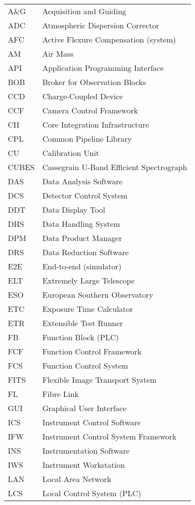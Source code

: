 \begin{longtable}{ |l|l| }
A\&G & Acquisition and Guiding \\
ADC & Atmospheric Dispersion Corrector \\
AFC & Active Flexure Compensation (system) \\
AM & Air Mass \\
API & Application Programming Interface \\
BOB & Broker for Observation Blocks \\
CCD & Charge-Coupled Device \\
CCF & Camera Control Framework \\
CII & Core Integration Infrastructure \\
CPL & Common Pipeline Library \\
CU & Calibration Unit \\
CUBES & Cassegrain U-Band Efficient Spectrograph \\
DAS & Data Analysis Software \\
DCS & Detector Control System \\
DDT & Data Display Tool \\
DHS & Data Handling System \\
DPM & Data Product Manager \\
DRS & Data Reduction Software \\
E2E & End-to-end (simulator) \\
ELT & Extremely Large Telescope \\
ESO & European Southern Observatory \\
ETC & Exposure Time Calculator \\
ETR & Extensible Test Runner \\
FB & Function Block (PLC) \\
FCF & Function Control Framework \\
FCS & Function Control System \\
FITS & Flexible Image Transport System \\
FL & Fibre Link \\
GUI & Graphical User Interface \\
ICS & Instrument Control Software \\
IFW & Instrument Control System Framework \\
INS & Instrumentation Software \\
IWS & Instrument Workstation \\
LAN & Local Area Network \\
LCS & Local Control System (PLC) \\

\end{longtable}
